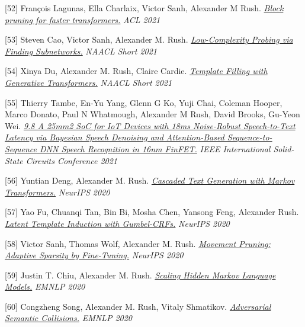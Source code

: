 \documentclass[10pt]{article}
\begin{document}
\medskip


[52] \ind François Lagunas, Ella Charlaix, Victor Sanh, Alexander M Rush. \emph{\href{ https://arxiv.org/pdf/2109.04838 }{ Block pruning for faster transformers.} }\emph{ ACL 2021 }

\medskip


[53] \ind Steven Cao, Victor Sanh, Alexander M. Rush. \emph{\href{ https://aclanthology.org/2021.naacl-main.74/ }{ Low-Complexity Probing via Finding Subnetworks.} }\emph{ NAACL Short 2021 }

\medskip


[54] \ind Xinya Du, Alexander M. Rush, Claire Cardie. \emph{\href{ https://aclanthology.org/2021.naacl-main.70/ }{ Template Filling with Generative Transformers.} }\emph{ NAACL Short 2021 }

\medskip


[55] \ind Thierry Tambe, En-Yu Yang, Glenn G Ko, Yuji Chai, Coleman Hooper, Marco Donato, Paul N Whatmough, Alexander M Rush, David Brooks, Gu-Yeon Wei. \emph{\href{ https://ieeexplore.ieee.org/abstract/document/9366062 }{ 9.8 A 25mm2 SoC for IoT Devices with 18ms Noise-Robust Speech-to-Text Latency via Bayesian Speech Denoising and Attention-Based Sequence-to-Sequence DNN Speech Recognition in 16nm FinFET.} }\emph{ IEEE International Solid-State Circuits Conference 2021 }

\medskip


[56] \ind Yuntian Deng, Alexander M. Rush. \emph{\href{ https://arxiv.org/pdf/2006.01112 }{ Cascaded Text Generation with Markov Transformers.} }\emph{ NeurIPS 2020 }

\medskip


[57] \ind Yao Fu, Chuanqi Tan, Bin Bi, Mosha Chen, Yansong Feng, Alexander Rush. \emph{\href{ https://github.com/FranxYao/Gumbel-CRF }{ Latent Template Induction with Gumbel-CRFs.} }\emph{ NeurIPS 2020 }

\medskip


[58] \ind Victor Sanh, Thomas Wolf, Alexander M. Rush. \emph{\href{ https://arxiv.org/pdf/2005.07683 }{ Movement Pruning: Adaptive Sparsity by Fine-Tuning.} }\emph{ NeurIPS 2020 }

\medskip


[59] \ind Justin T. Chiu, Alexander M. Rush. \emph{\href{ https://arxiv.org/abs/2011.04640 }{ Scaling Hidden Markov Language Models.} }\emph{ EMNLP 2020 }

\medskip


[60] \ind Congzheng Song, Alexander M. Rush, Vitaly Shmatikov. \emph{\href{ https://www.cs.cornell.edu/~shmat/shmat_emnlp20.pdf }{ Adversarial Semantic Collisions.} }\emph{ EMNLP 2020 }
\end{document}
